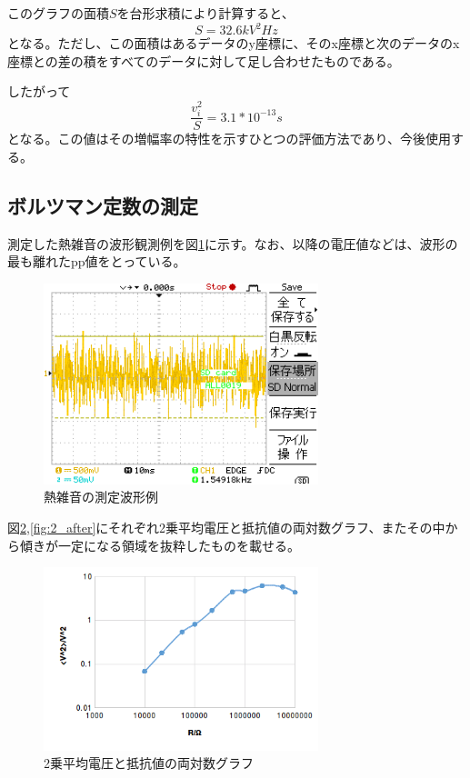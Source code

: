 \documentclass[11pt,a4j]{jsarticle}
\begin{document}
   このグラフの面積$S$を台形求積により計算すると、
   \begin{equation}
   S = 32.6 kV^2 Hz \nonumber
   \end{equation}
   となる。ただし、この面積はあるデータのy座標に、そのx座標と次のデータのx座標との差の積をすべてのデータに対して足し合わせたものである。
   
   したがって
   \begin{equation}
   \frac{v_i^2}{S} = 3.1 * 10^{-13} s \nonumber
   \end{equation}
   となる。この値はその増幅率の特性を示すひとつの評価方法であり、今後使用する。
   
   \subsection{ボルツマン定数の測定}
   
   測定した熱雑音の波形観測例を図\ref{fig:wave1}に示す。なお、以降の電圧値などは、波形の最も離れたpp値をとっている。
   
   \begin{figure}[htbp]
  \centering
  \includegraphics[width=8cm,clip]{A0019DS.png}
  \caption{熱雑音の測定波形例}
  \label{fig:wave1}
 \end{figure}%
   
   図\ref{fig:2_before},\ref{fig:2_after}にそれぞれ2乗平均電圧と抵抗値の両対数グラフ、またその中から傾きが一定になる領域を抜粋したものを載せる。
   \begin{figure}[htbp]
  \centering
  \includegraphics[width=8cm,clip]{2_before.png}
  \caption{2乗平均電圧と抵抗値の両対数グラフ}
  \label{fig:2_before}
 \end{figure}%
   
\end{document}
